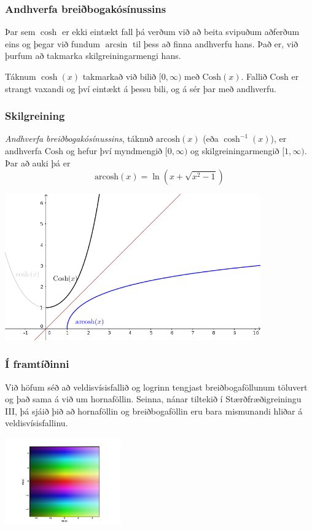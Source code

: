 \documentclass[icelandic,a4paper,12pt]{article}
\newcommand{\Cosh}{{\text{Cosh}}}
\newcommand{\arcosh}{{\text{arcosh}}}
\begin{document}
\subsubsection{Andhverfa breiðbogakósínussins}
Þar sem $\cosh$ er ekki eintækt fall þá verðum við að beita 
svipuðum aðferðum eins og þegar við fundum $\arcsin$ til þess
að finna andhverfu hans. \pause Það er, við þurfum að takmarka
skilgreiningarmengi hans. 

\pause

Táknum $\cosh(x)$ takmarkað við bilið $[0,\infty)$
með $\Cosh(x)$. \pause Fallið $\Cosh$ er strangt 
vaxandi og því eintækt á þessu bili, og á sér þar með andhverfu.

\pause

\subsubsection{Skilgreining}
\emph{Andhverfa breiðbogakósínussins}, táknuð $\arcosh(x)$ (eða $\cosh^{-1}(x)$), 
er andhverfa $\Cosh$ og hefur því myndmengið $[0,\infty)$ 
og skilgreiningarmengið $[1,\infty)$. Þar að auki þá er
\begin{equation*}
\arcosh(x) = \ln\left(x+\sqrt{x^2-1}\right)
\end{equation*}

\begin{center}
\includegraphics[width=11cm,keepaspectratio=true]{./myndir/kafli04/07_arcosh.png}
\end{center}

\subsubsection{Í framtíðinni}
Við höfum séð að veldisvísisfallið og logrinn tengjast
breiðbogaföllunum töluvert og það sama á við um hornaföllin. 
Seinna, nánar tiltekið í Stærðfræðigreiningu III, þá sjáið
þið að hornaföllin og breiðbogaföllin eru bara mismunandi hliðar
á veldisvísisfallinu.

\begin{center}
\includegraphics[width=5cm,keepaspectratio=true]{./myndir/kafli04/07_exp.png}
\end{center}
%
\end{document}
